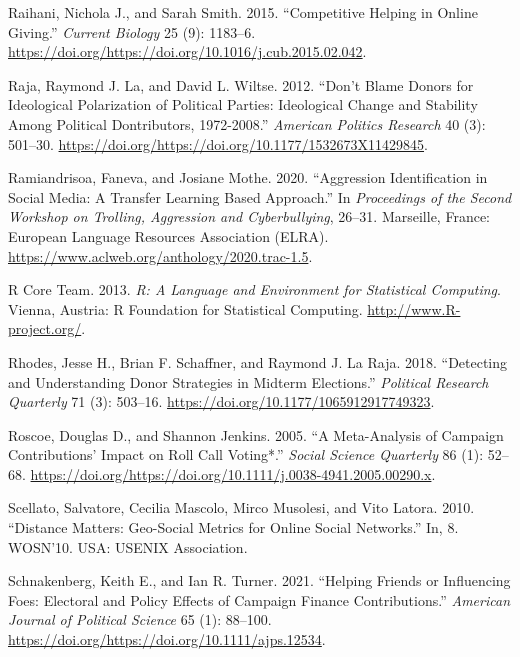 \documentclass[12pt,]{article}
\begin{document}
\leavevmode\hypertarget{ref-raihani2015}{}%
Raihani, Nichola J., and Sarah Smith. 2015. ``Competitive Helping in
Online Giving.'' \emph{Current Biology} 25 (9): 1183--6.
\url{https://doi.org/https://doi.org/10.1016/j.cub.2015.02.042}.

\leavevmode\hypertarget{ref-laraja2012}{}%
Raja, Raymond J. La, and David L. Wiltse. 2012. ``Don't Blame Donors for
Ideological Polarization of Political Parties: Ideological Change and
Stability Among Political Dontributors, 1972-2008.'' \emph{American
Politics Research} 40 (3): 501--30.
\url{https://doi.org/https://doi.org/10.1177/1532673X11429845}.

\leavevmode\hypertarget{ref-ramiandrisoa2020}{}%
Ramiandrisoa, Faneva, and Josiane Mothe. 2020. ``Aggression
Identification in Social Media: A Transfer Learning Based Approach.'' In
\emph{Proceedings of the Second Workshop on Trolling, Aggression and
Cyberbullying}, 26--31. Marseille, France: European Language Resources
Association (ELRA).
\url{https://www.aclweb.org/anthology/2020.trac-1.5}.

\leavevmode\hypertarget{ref-r}{}%
R Core Team. 2013. \emph{R: A Language and Environment for Statistical
Computing}. Vienna, Austria: R Foundation for Statistical Computing.
\url{http://www.R-project.org/}.

\leavevmode\hypertarget{ref-rhodes2018}{}%
Rhodes, Jesse H., Brian F. Schaffner, and Raymond J. La Raja. 2018.
``Detecting and Understanding Donor Strategies in Midterm Elections.''
\emph{Political Research Quarterly} 71 (3): 503--16.
\url{https://doi.org/10.1177/1065912917749323}.

\leavevmode\hypertarget{ref-roscoe2005}{}%
Roscoe, Douglas D., and Shannon Jenkins. 2005. ``A Meta-Analysis of
Campaign Contributions' Impact on Roll Call Voting*.'' \emph{Social
Science Quarterly} 86 (1): 52--68.
\url{https://doi.org/https://doi.org/10.1111/j.0038-4941.2005.00290.x}.

\leavevmode\hypertarget{ref-scellato2010}{}%
Scellato, Salvatore, Cecilia Mascolo, Mirco Musolesi, and Vito Latora.
2010. ``Distance Matters: Geo-Social Metrics for Online Social
Networks.'' In, 8. WOSN'10. USA: USENIX Association.

\leavevmode\hypertarget{ref-schnakenberg2021}{}%
Schnakenberg, Keith E., and Ian R. Turner. 2021. ``Helping Friends or
Influencing Foes: Electoral and Policy Effects of Campaign Finance
Contributions.'' \emph{American Journal of Political Science} 65 (1):
88--100. \url{https://doi.org/https://doi.org/10.1111/ajps.12534}.
\end{document}
